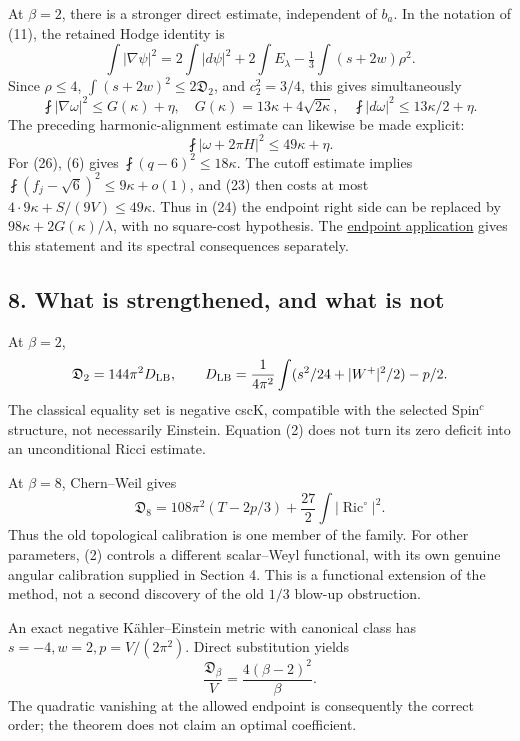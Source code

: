 \documentclass[
  10pt,
]{article}
\begin{document}
At \(\beta=2\), there is a stronger direct estimate, independent of
\(b_a\). In the notation of (11), the retained Hodge identity is \[
\int|\nabla\psi|^2
=2\int|d\psi|^2+2\int E_\lambda
-\tfrac13\int(s+2w)\rho^2.
\] Since \(\rho\le4\), \(\int(s+2w)^2\le2\mathfrak D_2\), and
\(c_2^2=3/4\), this gives simultaneously \[
\fint|\nabla\omega|^2\le G(\kappa)+\eta,
\quad G(\kappa)=13\kappa+4\sqrt{2\kappa},
\quad
\fint|d\omega|^2\le13\kappa/2+\eta.
\tag{25}
\] The preceding harmonic-alignment estimate can likewise be made
explicit: \[
\fint|\omega+2\pi H|^2\le49\kappa+\eta.
\tag{26}
\] For (26), (6) gives \(\fint(q-6)^2\le18\kappa\). The cutoff estimate
implies \(\fint(f_j-\sqrt6)^2\le9\kappa+o(1)\), and (23) then costs at
most \(4\cdot9\kappa+S/(9V)\le49\kappa\). Thus in (24) the endpoint
right side can be replaced by \(98\kappa+2G(\kappa)/\lambda\), with no
square-cost hypothesis. The
\href{line1_composed_application.md}{endpoint application} gives this
statement and its spectral consequences separately.

\hypertarget{what-is-strengthened-and-what-is-not}{%
\subsection{8. What is strengthened, and what is
not}\label{what-is-strengthened-and-what-is-not}}

At \(\beta=2\), \[
\mathfrak D_2=144\pi^2D_{\rm LB},\qquad
D_{\rm LB}=\frac1{4\pi^2}\int(s^2/24+|W^+|^2/2)-p/2.
\] The classical equality set is negative cscK, compatible with the
selected Spin\(^c\) structure, not necessarily Einstein. Equation (2)
does not turn its zero deficit into an unconditional Ricci estimate.

At \(\beta=8\), Chern--Weil gives \[
\mathfrak D_8
=108\pi^2(T-2p/3)+\frac{27}{2}\int|\operatorname{Ric}^{\circ}|^2.
\tag{27}
\] Thus the old topological calibration is one member of the family. For
other parameters, (2) controls a different scalar--Weyl functional, with
its own genuine angular calibration supplied in Section 4. This is a
functional extension of the method, not a second discovery of the old
\(1/3\) blow-up obstruction.

An exact negative Kähler--Einstein metric with canonical class has
\(s=-4,w=2,p=V/(2\pi^2)\). Direct substitution yields \[
\frac{\mathfrak D_\beta}{V}
=\frac{4(\beta-2)^2}{\beta}.
\tag{28}
\] The quadratic vanishing at the allowed endpoint is consequently the
correct order; the theorem does not claim an optimal coefficient.
\end{document}
